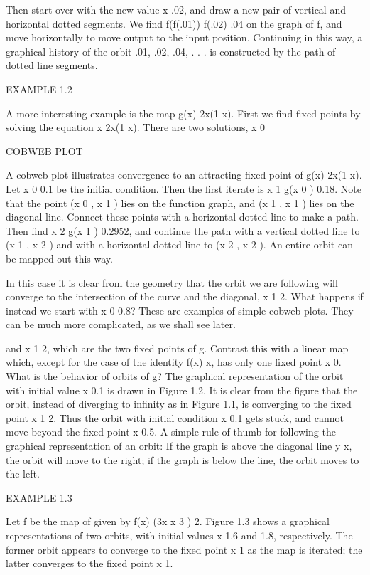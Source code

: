 \documentclass[12pt]{article}
\begin{document}
Then start over with the new value x  .02, and draw a new pair of vertical and horizontal dotted segments. 
We find f(f(.01))  f(.02)  .04 on the graph of f, and move horizontally to move output to the input 
position. Continuing in this way, a graphical history of the orbit .01, .02, .04, . . .  is constructed by 
the path of dotted line segments.

EXAMPLE 1.2

A more interesting example is the map g(x)  2x(1  x). First we find fixed points by solving the equation x  
2x(1  x). There are two solutions, x  0

COBWEB PLOT

A cobweb plot illustrates convergence to an attracting fixed point of g(x)  2x(1  x). Let x 0  0.1 be the 
initial condition. Then the first iterate is x 1  g(x 0 )  0.18. Note that the point (x 0 , x 1 ) lies on 
the function graph, and (x 1 , x 1 ) lies on the diagonal line. Connect these points with a horizontal 
dotted line to make a path. Then find x 2  g(x 1 )  0.2952, and continue the path with a vertical dotted 
line to (x 1 , x 2 ) and with a horizontal dotted line to (x 2 , x 2 ). An entire orbit can be mapped out 
this way.

In this case it is clear from the geometry that the orbit we are following will converge to the 
intersection of the curve and the diagonal, x  1  2. What happens if instead we start with x 0  0.8? These 
are examples of simple cobweb plots. They can be much more complicated, as we shall see later.

and x  1  2, which are the two fixed points of g. Contrast this with a linear map which, except for the 
case of the identity f(x)  x, has only one fixed point x  0. What is the behavior of orbits of g? The 
graphical representation of the orbit with initial value x  0.1 is drawn in Figure 1.2. It is clear from 
the figure that the orbit, instead of diverging to infinity as in Figure 1.1, is converging to the fixed 
point x  1  2. Thus the orbit with initial condition x  0.1 gets stuck, and cannot move beyond the fixed 
point x  0.5. A simple rule of thumb for following the graphical representation of an orbit: If the graph 
is above the diagonal line y  x, the orbit will move to the right; if the graph is below the line, the 
orbit moves to the left.

EXAMPLE 1.3

Let f be the map of given by f(x)  (3x  x 3 )  2. Figure 1.3 shows a graphical representations of two 
orbits, with initial values x  1.6 and 1.8, respectively. The former orbit appears to converge to the fixed 
point x  1 as the map is iterated; the latter converges to the fixed point x  1.
\end{document}
